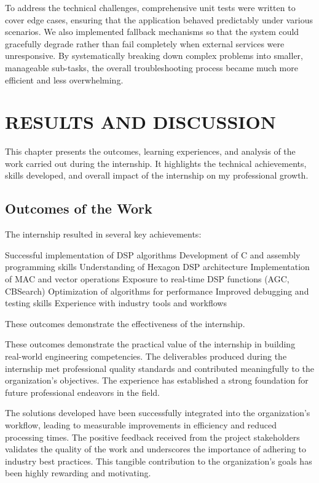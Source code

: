 \documentclass[12pt,a4paper]{report}
\begin{document}
To address the technical challenges, comprehensive unit tests were written to cover edge cases, ensuring that the application behaved predictably under various scenarios. We also implemented fallback mechanisms so that the system could gracefully degrade rather than fail completely when external services were unresponsive. By systematically breaking down complex problems into smaller, manageable sub-tasks, the overall troubleshooting process became much more efficient and less overwhelming.


\chapter{RESULTS AND DISCUSSION}
\label{ch:results}


This chapter presents the outcomes, learning experiences, and analysis of the work carried out during the internship. It highlights the technical achievements, skills developed, and overall impact of the internship on my professional growth.




\section{Outcomes of the Work}

The internship resulted in several key achievements:


Successful implementation of DSP algorithms Development of C and assembly programming skills Understanding of Hexagon DSP architecture Implementation of MAC and vector operations Exposure to real-time DSP functions (AGC, CBSearch) Optimization of algorithms for performance Improved debugging and testing skills Experience with industry tools and workflows


These outcomes demonstrate the effectiveness of the internship.


These outcomes demonstrate the practical value of the internship in building real-world engineering competencies. The deliverables produced during the internship met professional quality standards and contributed meaningfully to the organization's objectives. The experience has established a strong foundation for future professional endeavors in the field.


The solutions developed have been successfully integrated into the organization's workflow, leading to measurable improvements in efficiency and reduced processing times. The positive feedback received from the project stakeholders validates the quality of the work and underscores the importance of adhering to industry best practices. This tangible contribution to the organization's goals has been highly rewarding and motivating.
\end{document}
